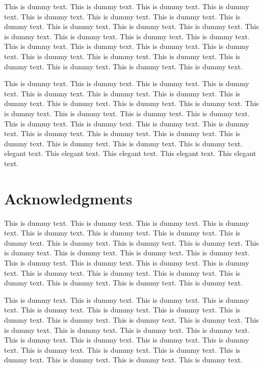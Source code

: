 \documentclass{book}
\begin{document}
This is dummy text. This is dummy text. This is dummy text. This is dummy text. This is dummy text. This is dummy text. This is dummy text. This is dummy text. This is dummy text. This is dummy text. This is dummy text. This is dummy text. This is dummy text. This is dummy text. This is dummy text. This is dummy text. This is dummy text. This is dummy text. This is dummy text. This is dummy text. This is dummy text. This is dummy text. This is dummy text. This is dummy text. This is dummy text. This is dummy text. 

This is dummy text. This is dummy text. This is dummy text. This is dummy text. This is dummy text. This is dummy text. This is dummy text. This is dummy text. This is dummy text. This is dummy text. This is dummy text. This is dummy text. This is dummy text. This is dummy text. This is dummy text. This is dummy text. This is dummy text. This is dummy text. This is dummy text. This is dummy text. This is dummy text. This is dummy text. This is dummy text. This is dummy text. This is dummy text. This is dummy text. elegant text. This elegant text. This elegant text. This elegant text. This elegant text. 

\chapter*{Acknowledgments}

This is dummy text. This is dummy text. This is dummy text. This is dummy text. This is dummy text. This is dummy text. This is dummy text. This is dummy text. This is dummy text. This is dummy text. This is dummy text. This is dummy text. This is dummy text. This is dummy text. This is dummy text. This is dummy text. This is dummy text. This is dummy text. This is dummy text. This is dummy text. This is dummy text. This is dummy text. This is dummy text. This is dummy text. This is dummy text. This is dummy text. 

This is dummy text. This is dummy text. This is dummy text. This is dummy text. This is dummy text. This is dummy text. This is dummy text. This is dummy text. This is dummy text. This is dummy text. This is dummy text. This is dummy text. This is dummy text. This is dummy text. This is dummy text. This is dummy text. This is dummy text. This is dummy text. This is dummy text. This is dummy text. This is dummy text. This is dummy text. This is dummy text. This is dummy text. This is dummy text. This is dummy text. 
\end{document}
